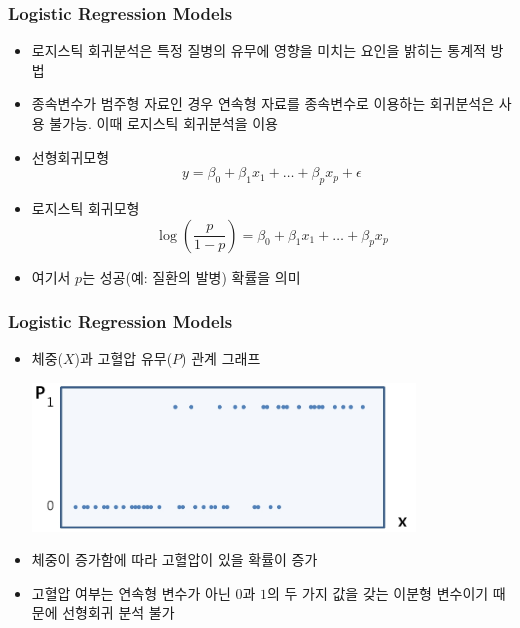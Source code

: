\documentclass[10pt,xcolor={svgnames},t]{beamer}
\begin{document}
%
\begin{frame}
	\frametitle{Logistic Regression Models}
	
	\begin{itemize}
		\item 로지스틱 회귀분석은 특정 질병의 유무에 영향을 미치는 요인을 밝히는 통계적 방법
		\bigskip
		\item 종속변수가 범주형 자료인 경우 연속형 자료를 종속변수로 이용하는 회귀분석은 사용 불가능. 이때 로지스틱 회귀분석을 이용
		\bigskip
		\item 선형회귀모형
		\[ 	y = \beta_0 + \beta_1 x_{1} + \ldots + \beta_p x_{p} + \epsilon
		\]
		\smallskip
		\item 로지스틱 회귀모형
			\[ \log(\frac{p}{1-p})= \beta_0 + \beta_1 x_{1} + \ldots + \beta_p x_{p} 
			\]
		\item[] 여기서 $p$는 성공(예: 질환의 발병) 확률을 의미
	\end{itemize}
	
	
\end{frame}
%
%
\begin{frame}
	\frametitle{Logistic Regression Models}
	
	\begin{itemize}
		\item 체중($X$)과 고혈압 유무($P$) 관계 그래프
			\begin{center}
				\includegraphics[width=0.8\textwidth]{lo1.jpg}
			\end{center}
			\bigskip
		\item 체중이 증가함에 따라 고혈압이 있을 확률이 증가
		\bigskip
		\item 고혈압 여부는 연속형 변수가 아닌 $0$과 $1$의 두 가지 값을 갖는 이분형 변수이기 때문에 선형회귀 분석 불가
	\end{itemize}
	
	
\end{frame}
\end{document}
